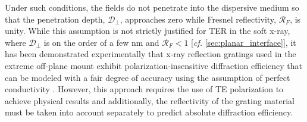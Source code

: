 Under such conditions, the fields do not penetrate into the dispersive medium so that the penetration depth, $\mathcal{D}_{\perp}$, approaches zero while Fresnel reflectivity, $\mathcal{R}_F$, is unity. 
While this assumption is not strictly justified for TER in the soft x-ray, where $\mathcal{D}_{\perp}$ is on the order of a few \si{\nm} and $\mathcal{R}_F<1$ [\emph{cf.\@} \cref{sec:planar_interface}], it has been demonstrated experimentally that x-ray reflection gratings used in the extreme off-plane mount exhibit polarization-insensitive diffraction efficiency that can be modeled with a fair degree of accuracy using the assumption of perfect conductivity \cite{Marlowe16}. 
However, this approach requires the use of TE polarization to achieve physical results and additionally, the reflectivity of the grating material must be taken into account separately to predict absolute diffraction efficiency. 

